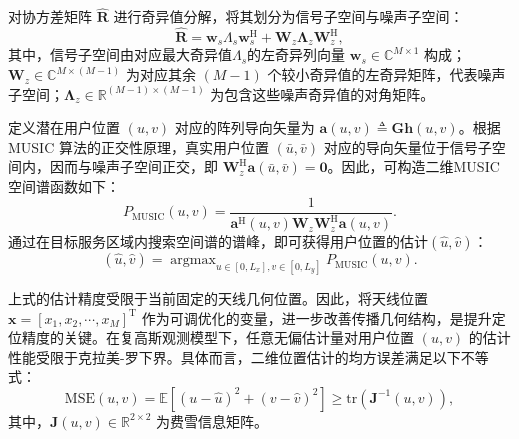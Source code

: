 对协方差矩阵 $\hat{\bm{R}}$ 进行奇异值分解，将其划分为信号子空间与噪声子空间：
\begin{equation}\label{eq:pass_music_svd}
	\hat{\bm{R}} = \bm{w}_s \Lambda_s \bm{w}_s^{\mathrm{H}} + \bm{W}_z \bm{\Lambda}_z \bm{W}_z^{\mathrm{H}},
\end{equation}
其中，信号子空间由对应最大奇异值$\Lambda_s$的左奇异列向量 $\bm{w}_s \in \mathbb{C}^{M \times 1}$ 构成；$\bm{W}_z \in \mathbb{C}^{M \times (M-1)}$ 为对应其余 $(M-1)$ 个较小奇异值的左奇异矩阵，代表噪声子空间；$\bm{\Lambda}_z \in \mathbb{R}^{(M-1) \times (M-1)}$ 为包含这些噪声奇异值的对角矩阵。

定义潜在用户位置 $(u,v)$ 对应的阵列导向矢量为 $\bm{a}(u,v) \triangleq \bm{G} \bm{h}(u,v)$。根据 MUSIC 算法的正交性原理，真实用户位置 $(\bar{u}, \bar{v})$ 对应的导向矢量位于信号子空间内，因而与噪声子空间正交，即 $\bm{W}_z^{\mathrm{H}} \bm{a}(\bar{u}, \bar{v}) = \bm{0}$。因此，可构造二维MUSIC空间谱函数如下：
\begin{equation}\label{eq:pass_music_spectrum}
	P_{\mathrm{MUSIC}}(u,v) = \frac{1}{\bm{a}^{\mathrm{H}}(u,v)\bm{W}_z \bm{W}_z^{\mathrm{H}}\bm{a}(u,v)}.
\end{equation}
通过在目标服务区域内搜索空间谱的谱峰，即可获得用户位置的估计$(\hat{u}, \hat{v})$：
\begin{equation}\label{eq:pass_music_peak}
	(\hat{u}, \hat{v}) = \mathop{\arg\max}_{u \in [0,L_x], v \in [0,L_y]} P_{\mathrm{MUSIC}}(u,v).
\end{equation}

上式的估计精度受限于当前固定的天线几何位置。因此，将天线位置 $\bm{x} = [x_1, x_2, \cdots, x_M]^{\mathrm{T}}$ 作为可调优化的变量，进一步改善传播几何结构，是提升定位精度的关键。在复高斯观测模型下，任意无偏估计量对用户位置 $(u,v)$ 的估计性能受限于克拉美-罗下界。具体而言，二维位置估计的均方误差满足以下不等式：
\begin{equation}\label{eq:pass_mse_crlb}
	\mathrm{MSE}(u,v) = \mathbb{E}\left[ (u-\hat{u})^2+(v-\hat{v})^2 \right] \geq \mathrm{tr}\left( \bm{J}^{-1}(u, v) \right),
\end{equation}
其中，$\bm{J}(u, v) \in \mathbb{R}^{2 \times 2}$ 为费雪信息矩阵。

